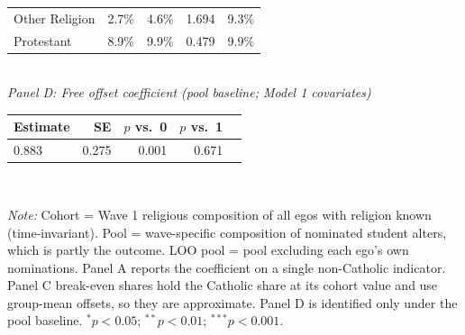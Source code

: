 \begin{table}[htbp]
\begin{tabular}{lrrrr}
Other Religion & 2.7\% & 4.6\% & 1.694 & 9.3\% \\
Protestant & 8.9\% & 9.9\% & 0.479 & 9.9\% \\
\bottomrule
\end{tabular}
\\[8pt]
\textit{Panel D: Free offset coefficient (pool baseline; Model 1 covariates)}\\[2pt]
\begin{tabular}{lrrrr}
\toprule
Estimate & SE & $p$ vs.\ 0 & $p$ vs.\ 1 \\
\midrule
0.883 & 0.275 & 0.001 & 0.671 \\
\bottomrule
\end{tabular}
\\[4pt]
\begin{minipage}{0.95\textwidth}\footnotesize \textit{Note:} Cohort = Wave 1 religious composition of all egos with religion known (time-invariant). Pool = wave-specific composition of nominated student alters, which is partly the outcome. LOO pool = pool excluding each ego's own nominations. Panel A reports the coefficient on a single non-Catholic indicator. Panel C break-even shares hold the Catholic share at its cohort value and use group-mean offsets, so they are approximate. Panel D is identified only under the pool baseline. $^{*}p<0.05$; $^{**}p<0.01$; $^{***}p<0.001$.\end{minipage}
\end{table}
